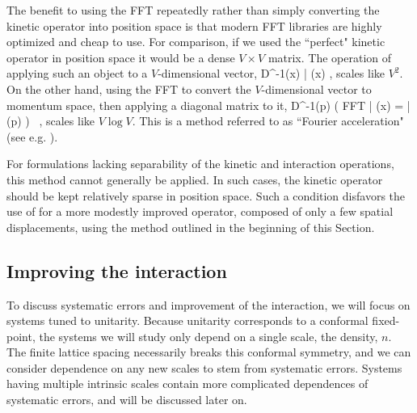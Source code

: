 The benefit to using the FFT repeatedly rather than simply converting the kinetic operator into position space is that modern FFT libraries are highly optimized and cheap to use. For comparison, if we used the ``perfect" kinetic operator in position space it would be a dense $V\times V$ matrix. The operation of applying such an object to a $V$-dimensional vector,
\beq
D^{-1}(x) | \psi(x) \rangle,
\eeq
scales like $V^2$. On the other hand, using the FFT to convert the $V$-dimensional vector to momentum space, then applying a diagonal matrix to it,
\beq
D^{-1}(p) \left( \mbox{FFT} | \psi(x) \rangle = | \tilde{\psi}(p) \rangle \right) \ ,
\eeq
scales like $V \log V$. This is a method referred to as ``Fourier acceleration" (see e.g. \cite{Batrouni,Daviesetal1,Daviesetal2,Katzetal1}). 

For formulations lacking separability of the kinetic and interaction operations, this method cannot generally be applied. In such cases, the kinetic operator should be kept relatively sparse in position space. Such a condition disfavors the use of  for a more modestly improved operator, composed of only a few spatial displacements, using the method outlined in the beginning of this Section.

\subsection{\label{sec:improve}Improving the interaction}
To discuss systematic errors and improvement of the interaction, we will focus on systems tuned to unitarity. Because unitarity corresponds to a conformal fixed-point, the systems we will study only depend on a single scale, the density, $n$. The finite lattice spacing necessarily breaks this conformal symmetry, and we can consider dependence on any new scales to stem from systematic errors. Systems having multiple intrinsic scales contain more complicated dependences of systematic errors, and will be discussed later on. 


